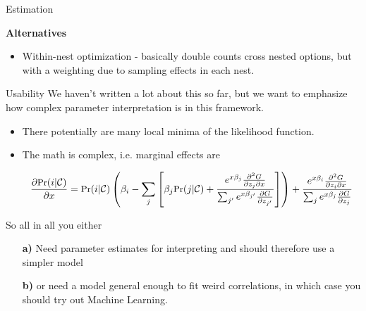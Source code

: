 \documentclass[10pt]{beamer}
\begin{document}
\begin{frame}{Estimation}

\textbf{Alternatives}
\begin{itemize}
\item Within-nest optimization - basically double counts cross nested options, but with a weighting due to sampling effects in each nest.
\end{itemize}
\end{frame}


\begin{frame}{Usability}
  We haven't written a lot about this so far, but we want to emphasize how complex parameter interpretation is in this framework.
  \begin{itemize}
    \item There potentially are many local minima of the likelihood function.
    \item The math is complex, i.e. marginal effects are

    \begin{equation}    \small{
        \frac{\partial \textrm{Pr}(i|\mathcal{C})}{\partial x} =
        \textrm{Pr}(i|\mathcal{C}) \left(
        \beta_i - \sum_j  \left[\beta_j \textrm{Pr}(j | \mathcal{C})  + \frac{e^{x\beta_j} \frac{\partial^2 G}{\partial z_j \partial x}}{\sum_{j'} e^{x\beta_{j'}} \frac{\partial G}{\partial z_{j'}}}  \right]    \right) +  \frac{e^{x\beta_i} \frac{\partial^2 G}{\partial z_i \partial x}}{\sum_j e^{x\beta_j} \frac{\partial G}{\partial z_j}}
}    \end{equation}
  \end{itemize}
  So all in all you either
  \begin{itemize}
    \item[\textbf{a)}] Need parameter estimates for interpreting and should therefore use a simpler model
    \item[\textbf{b)}] or need a model general enough to fit weird correlations, in which case you should try out Machine Learning.
  \end{itemize}
\end{frame}
\end{document}
